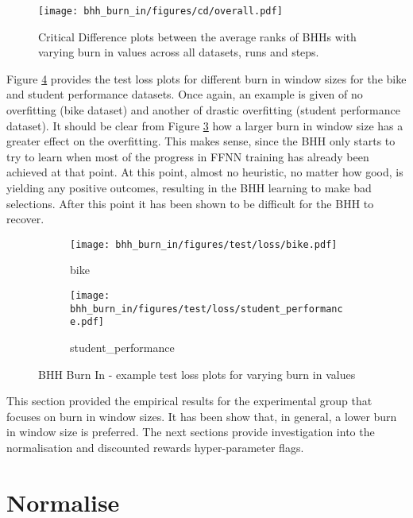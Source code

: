 \begin{figure}[htbp]
	\centering
	\texttt{[image: bhh\_burn\_in/figures/cd/overall.pdf]}
	\caption{Critical Difference plots between the average ranks of \Acsp{BHH} with varying burn in values across all datasets, runs and steps.}
	\label{fig:results:burn_in:descriptive:cd}
\end{figure}

Figure \ref{fig:results:burn_in:figures:loss} provides the test loss plots for different burn in window sizes for the bike and student performance datasets. Once again, an example is given of no overfitting (bike dataset) and another of drastic overfitting (student performance dataset). It should be clear from Figure \ref{fig:results:burn_in:figures:loss2} how a larger burn in window size has a greater effect on the overfitting. This makes sense, since the \Ac{BHH} only starts to try to learn when most of the progress in \ac{FFNN} training has already been achieved at that point. At this point, almost no heuristic, no matter how good, is yielding any positive outcomes, resulting in the \Ac{BHH} learning to make bad selections. After this point it has been shown to be difficult for the \Ac{BHH} to recover.



\begin{figure}[htbp]
	\begin{subfigure}{0.5\textwidth}
		\centering
		\texttt{[image: bhh\_burn\_in/figures/test/loss/bike.pdf]}
		\caption{bike}
		\label{fig:results:burn_in:figures:loss1}
	\end{subfigure}
	\begin{subfigure}{0.5\textwidth}
		\centering
		\texttt{[image: bhh\_burn\_in/figures/test/loss/student\_performance.pdf]}
		\caption{student\_performance}
		\label{fig:results:burn_in:figures:loss2}
	\end{subfigure}
	\caption{\Acs{BHH} Burn In - example test loss plots for varying burn in values}
	\label{fig:results:burn_in:figures:loss}
\end{figure}

This section provided the empirical results for the experimental group that focuses on burn in window sizes. It has been show that, in general, a lower burn in window size is preferred. The next sections provide investigation into the normalisation and discounted rewards hyper-parameter flags.




\section{Normalise}
\label{sec:results:normalise}

